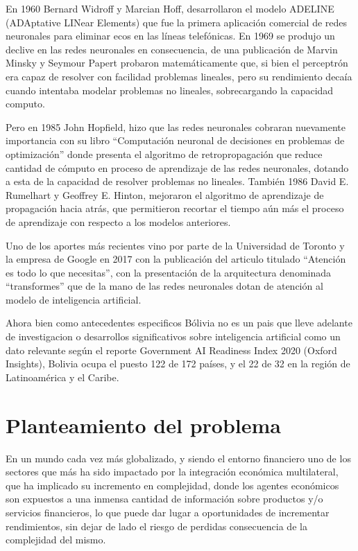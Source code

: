 \documentclass[
  12pt,
]{article}
\begin{document}
En 1960 Bernard Widroff y Marcian Hoff, desarrollaron el modelo ADELINE
(ADAptative LINear Elements) que fue la primera aplicación comercial de
redes neuronales para eliminar ecos en las líneas telefónicas. En 1969
se produjo un declive en las redes neuronales en consecuencia, de una
publicación de Marvin Minsky y Seymour Papert probaron matemáticamente
que, si bien el perceptrón era capaz de resolver con facilidad problemas
lineales, pero su rendimiento decaía cuando intentaba modelar problemas
no lineales, sobrecargando la capacidad computo.

Pero en 1985 John Hopfield, hizo que las redes neuronales cobraran
nuevamente importancia con su libro ``Computación neuronal de decisiones
en problemas de optimización'' donde presenta el algoritmo de
retropropagación que reduce cantidad de cómputo en proceso de
aprendizaje de las redes neuronales, dotando a esta de la capacidad de
resolver problemas no lineales. También 1986 David E. Rumelhart y
Geoffrey E. Hinton, mejoraron el algoritmo de aprendizaje de propagación
hacia atrás, que permitieron recortar el tiempo aún más el proceso de
aprendizaje con respecto a los modelos anteriores.

Uno de los aportes más recientes vino por parte de la Universidad de
Toronto y la empresa de Google en 2017 con la publicación del articulo
titulado ``Atención es todo lo que necesitas'', con la presentación de
la arquitectura denominada ``transformes'' que de la mano de las redes
neuronales dotan de atención al modelo de inteligencia artificial.

Ahora bien como antecedentes especificos Bólivia no es un pais que lleve
adelante de investigacion o desarrollos significativos sobre
inteligencia artificial como un dato relevante según el reporte
Government AI Readiness Index 2020 (Oxford Insights), Bolivia ocupa el
puesto 122 de 172 países, y el 22 de 32 en la región de Latinoamérica y
el Caribe.

\hypertarget{planteamiento-del-problema}{%
\section{Planteamiento del problema}\label{planteamiento-del-problema}}

En un mundo cada vez más globalizado, y siendo el entorno financiero uno
de los sectores que más ha sido impactado por la integración económica
multilateral, que ha implicado su incremento en complejidad, donde los
agentes económicos son expuestos a una inmensa cantidad de información
sobre productos y/o servicios financieros, lo que puede dar lugar a
oportunidades de incrementar rendimientos, sin dejar de lado el riesgo
de perdidas consecuencia de la complejidad del mismo.
\end{document}
